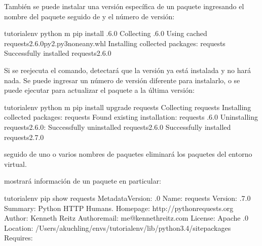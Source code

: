 \documentclass[a5paper,10pt,spanish]{sphinxmanual}
\begin{document}
\sphinxAtStartPar
También se puede instalar una versión específica de un paquete ingresando el nombre del paquete seguido de \sphinxcode{\sphinxupquote{==}} y el número de versión:

\begin{sphinxVerbatim}[commandchars=\\\{\}]
tutorial\PYGZhy{}env \PYGZdl{} python \PYGZhy{}m pip install .6.0
Collecting .6.0
  Using cached requests\PYGZhy{}2.6.0\PYGZhy{}py2.py3\PYGZhy{}none\PYGZhy{}any.whl
Installing collected packages: requests
Successfully installed requests\PYGZhy{}2.6.0
\end{sphinxVerbatim}

\sphinxAtStartPar
Si se re\sphinxhyphen{}ejecuta el comando,  detectará que la versión ya está instalada y no hará nada. Se puede ingresar un número de versión diferente para instalarlo, o se puede ejecutar  para actualizar el paquete a la última versión:

\begin{sphinxVerbatim}[commandchars=\\\{\}]
tutorial\PYGZhy{}env \PYGZdl{} python \PYGZhy{}m pip install \PYGZhy{}\PYGZhy{}upgrade requests
Collecting requests
Installing collected packages: requests
  Found existing installation: requests .6.0
    Uninstalling requests\PYGZhy{}2.6.0:
      Successfully uninstalled requests\PYGZhy{}2.6.0
Successfully installed requests\PYGZhy{}2.7.0
\end{sphinxVerbatim}

\sphinxAtStartPar
{} seguido de uno o varios nombres de paquetes eliminará los paquetes del entorno virtual.

\sphinxAtStartPar
{} mostrará información de un paquete en particular:

\begin{sphinxVerbatim}[commandchars=\\\{\}]
tutorial\PYGZhy{}env \PYGZdl{} pip show requests
\PYGZhy{}\PYGZhy{}\PYGZhy{}
Metadata\PYGZhy{}Version: .0
Name: requests
Version: .7.0
Summary: Python HTTP  Humans.
Home\PYGZhy{}page: http://python\PYGZhy{}requests.org
Author: Kenneth Reitz
Author\PYGZhy{}email: me@kennethreitz.com
License: Apache .0
Location: /Users/akuchling/envs/tutorial\PYGZhy{}env/lib/python3.4/site\PYGZhy{}packages
Requires:
\end{sphinxVerbatim}
\end{document}
